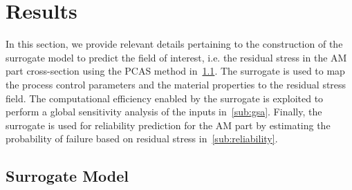 \section{Results}
\label{sec:results}

In this section, we provide relevant details pertaining to the construction of the surrogate model to predict
the field of interest, i.e. the
residual stress in the AM part cross-section using the PCAS method in~\ref{sub:surr}. The surrogate is used to map
the process control parameters and the material properties to the residual stress field. The computational efficiency
enabled by the surrogate is exploited to perform a global sensitivity analysis of the inputs in~\ref{sub:gsa}. Finally, the
surrogate is used for reliability prediction for the AM part by estimating the probability of failure based on residual stress
in~\ref{sub:reliability}.

\subsection{Surrogate Model}
\label{sub:surr}

